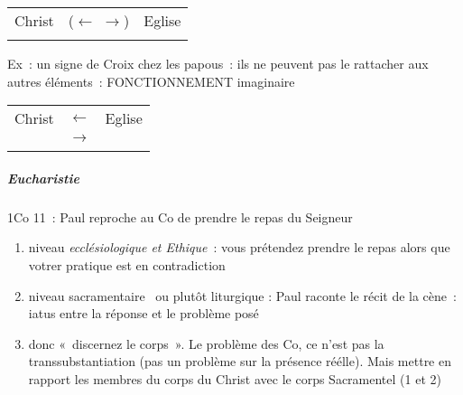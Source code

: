 

 
\begin{table}[h!]
    \centering
{}
 
\begin{tabular}{p{}p{}p{}}
\toprule
Christ &($\leftarrow$ $\rightarrow$) & Eglise \\
 
\\
\bottomrule
\end{tabular}
\label{tab:my_label}
\end{table}


 

Ex~: un signe de Croix chez les papous~: ils ne peuvent pas le rattacher
aux autres éléments~: FONCTIONNEMENT imaginaire

\begin{table}[h!]
    \centering
{}
\begin{tabular}{p{}p{}p{}}
\toprule
Christ &$\leftarrow$& Eglise \\
        &   $\rightarrow$ \\
\\
\bottomrule
\end{tabular}
\label{tab:my_label}
\end{table}


\hypertarget{eucharistie}{%
\subparagraph{Eucharistie}\label{eucharistie}}

1Co 11~: Paul reproche au Co de prendre le repas du Seigneur

\begin{enumerate}
\def\labelenumi{\arabic{enumi}.}
\item
  niveau \emph{ecclésiologique et Ethique}~: vous prétendez prendre le
  repas alors que votrer pratique est en contradiction
\item
  niveau sacramentaire~ ou plutôt liturgique : Paul raconte le récit de
  la cène~: iatus entre la réponse et le problème posé
\item
  donc «~discernez le corps~». Le problème des Co, ce n'est pas la
  transsubstantiation (pas
  un problème sur la présence réélle). Mais mettre en rapport les
  membres du corps du Christ avec le corps Sacramentel (1 et 2)
\end{enumerate}

